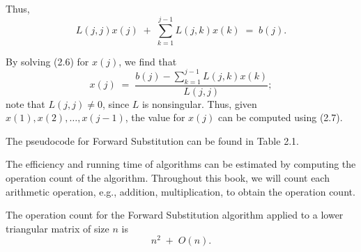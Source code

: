 Thus,
\begin{equation}
L(j,j)x(j) \;+\; \sum_{k=1}^{j-1} L(j,k)x(k) \;=\; b(j).
\end{equation}

By solving (2.6) for $x(j)$, we find that
\begin{equation}
x(j) \;=\; \frac{b(j) - \sum_{k=1}^{j-1} L(j,k)x(k)}{L(j,j)};
\end{equation}
note that $L(j,j)\neq 0$, since $L$ is nonsingular. Thus, given $x(1), x(2), \ldots,
x(j-1)$, the value for $x(j)$ can be computed using (2.7).

The pseudocode for Forward Substitution can be found in Table 2.1.

The efficiency and running time of algorithms can be estimated by computing the
operation count of the algorithm. Throughout this book, we will count each arithmetic
operation, e.g., addition, multiplication, to obtain the operation count.

\begin{lemma}
The operation count for the Forward Substitution algorithm applied to a lower
triangular matrix of size $n$ is
\begin{equation}
n^2 \;+\; O(n).
\end{equation}
\end{lemma}

\begin{table}[H]
\centering
\caption{Pseudocode for Forward Substitution}
\end{table}


